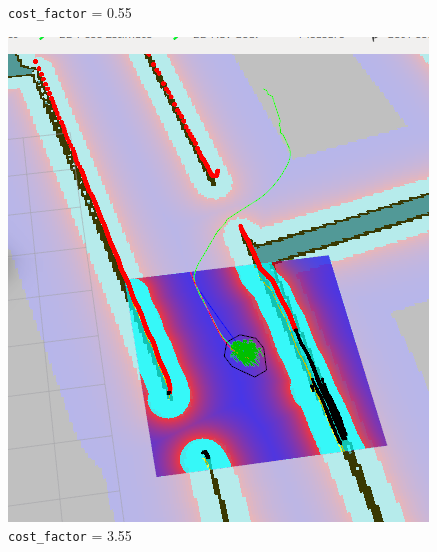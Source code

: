 \documentclass[12pt]{article}
\begin{document}
\begin{figure}[!htb]
  \caption{\texttt{cost\_factor} = 0.55}
\endminipage\hfill
{}
  \includegraphics[width=\linewidth]{Cf_hi.png}
  \caption{\texttt{cost\_factor} = 3.55}
\endminipage\hfill
\end{figure}
\end{document}
